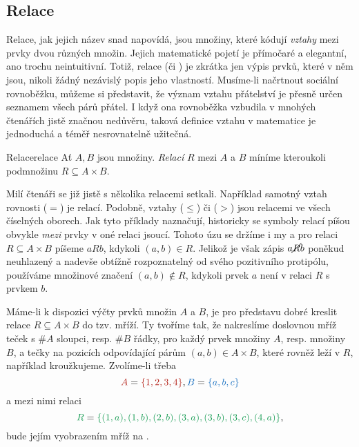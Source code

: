 \subsection{Relace}
\label{ssec:relace}

Relace, jak jejich název snad napovídá, jsou množiny, které kódují \emph{vztahy}
mezi prvky dvou různých množin. Jejich matematické pojetí je přímočaré a
elegantní, ano trochu neintuitivní. Totiž, relace (či ) je zkrátka jen
výpis prvků, které v něm jsou, nikoli žádný nezávislý popis jeho vlastností.
Musíme-li načrtnout sociální rovnoběžku, můžeme si představit, že význam vztahu
přátelství je přesně určen seznamem všech párů přátel. I když ona rovnoběžka
vzbudila v mnohých čtenářích jistě značnou nedůvěru, taková definice vztahu v
matematice je jednoduchá a téměř nesrovnatelně užitečná.

\begin{definition}{Relace}{relace}
 Ať $A,B$ jsou množiny. \emph{Relací} $R$ mezi $A$ a $B$ míníme kteroukoli
 podmnožinu $R \subseteq A \times B$.
\end{definition}

Milí čtenáři se již jistě s několika relacemi setkali. Například samotný vztah
rovnosti ($=$) je relací. Podobně, vztahy  ($ \leq $)
či  ($>$) jsou relacemi ve všech číselných oborech. Jak
tyto příklady naznačují, historicky se symboly relací píšou obvykle \emph{mezi}
prvky v oné relaci jsoucí. Tohoto úzu se držíme i my a pro relaci $R \subseteq A
\times B$ píšeme $aRb$, kdykoli $(a,b) \in R$. Jelikož je však zápis
$a\cancel{R}b$ poněkud neuhlazený a nadevše obtížně rozpoznatelný od svého
pozitivního protipólu, používáme množinové značení $(a,b) \notin R$, kdykoli
prvek $a$ není v relaci $R$ s prvkem $b$.

Máme-li k dispozici výčty prvků množin $A$ a $B$, je pro představu dobré kreslit
relace $R \subseteq A \times B$ do tzv. mříží. Ty tvoříme tak, že nakreslíme
doslovnou mříž teček s $\# A$ sloupci, resp. $\# B$ řádky, pro každý prvek
množiny $A$, resp. množiny $B$, a tečky na pozicích odpovídající párům $(a,b)
\in A \times B$, které rovněž leží v $R$, například kroužkujeme. Zvolíme-li
třeba
\[
 \clr{A} = \clr{\{1,2,3,4\}}, \clb{B} = \clb{\{a,b,c\}}
\]
a mezi nimi relaci
\[
 \clg{R} = \clg{\{(1,a),(1,b),(2,b),(3,a),(3,b),(3,c),(4,a)\}},
\]
bude jejím vyobrazením mříž na .

